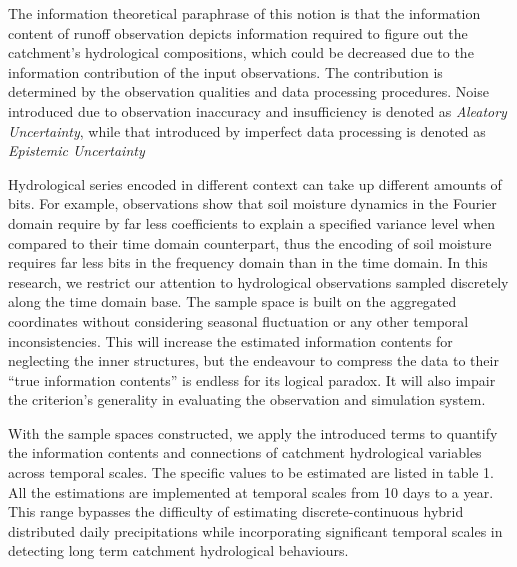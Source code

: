 \documentclass[draft,wrr]{AGUTeX}
\begin{document}
\begin{article}
The information theoretical paraphrase of this notion is that the information content of runoff observation depicts information required to figure out the catchment's hydrological compositions, which could be decreased due to the information contribution of the input observations. The contribution is determined by the observation qualities and data processing procedures.
Noise introduced due to observation inaccuracy and insufficiency is denoted as \emph{Aleatory Uncertainty}, while that introduced by imperfect data processing is denoted as \emph{Epistemic Uncertainty}



Hydrological series encoded in different context can take up different amounts of bits. For example,  observations show that  soil
moisture dynamics in the Fourier domain require by far less
coefficients to explain a specified variance level when
compared to their time domain counterpart\citep{katul2007spectrum}, thus the encoding of soil moisture requires far less bits in the frequency domain than in the time domain. In this research, we restrict our attention to hydrological observations sampled discretely along the time domain base. The sample space is built on the aggregated coordinates without considering seasonal fluctuation or any other temporal inconsistencies. This will increase the estimated information contents for neglecting the inner structures, but the endeavour to compress the data to their ``true information contents'' is endless for its logical paradox\citep{li2009introduction}. It will also impair the criterion's generality in evaluating the observation and simulation system.  

 


With the sample spaces constructed,
we apply the introduced terms to quantify the information contents and connections of catchment hydrological variables across temporal scales. The specific values to be estimated are listed in table 1. All the estimations are implemented at temporal scales from 10 days to a year. This range  bypasses the difficulty of estimating discrete-continuous hybrid distributed daily precipitations\citep{gong2014estimating} while incorporating significant temporal scales in detecting long term catchment hydrological behaviours. 


\end{article}
\end{document}
